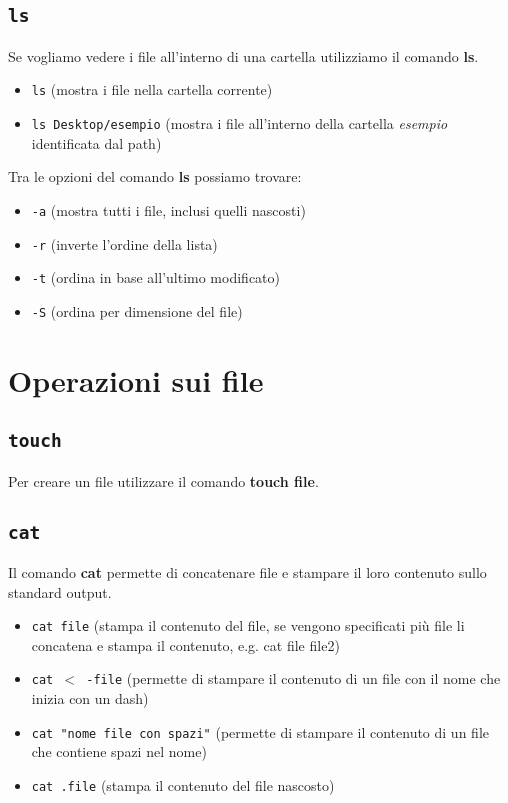 \subsection{\texttt{ls}}
Se vogliamo vedere i file all'interno di una cartella utilizziamo il comando \textbf{ls}.
\begin{itemize}
    \item \texttt{ls} (mostra i file nella cartella corrente)
    \item \texttt{ls Desktop/esempio} (mostra i
    file all'interno della cartella \textit{esempio}
    identificata dal path)
\end{itemize}
Tra le opzioni del comando \textbf{ls} possiamo trovare:
\begin{itemize}
    \item \texttt{-a} (mostra tutti i file, inclusi quelli nascosti)
    \item \texttt{-r} (inverte l'ordine della lista)
    \item \texttt{-t} (ordina in base all'ultimo modificato)
    \item \texttt{-S} (ordina per dimensione del file)
\end{itemize}

\section{Operazioni sui file}
\subsection{\texttt{touch}}
Per creare un file utilizzare il comando \textbf{touch file}.

\subsection{\texttt{cat}}
Il comando \textbf{cat} permette di concatenare file e stampare il loro contenuto sullo standard output.
\begin{itemize}
    \item \texttt{cat file} (stampa il contenuto del file, se vengono specificati più file li concatena e stampa il contenuto, e.g. cat file file2)
    \item \texttt{cat $<$ -file} (permette di stampare il contenuto di un file con il nome che inizia con un dash)
    \item \texttt{cat "nome file con spazi"} (permette di stampare il contenuto di un file che contiene spazi nel nome)
    \item \texttt{cat .file} (stampa il contenuto del file nascosto)
\end{itemize}

